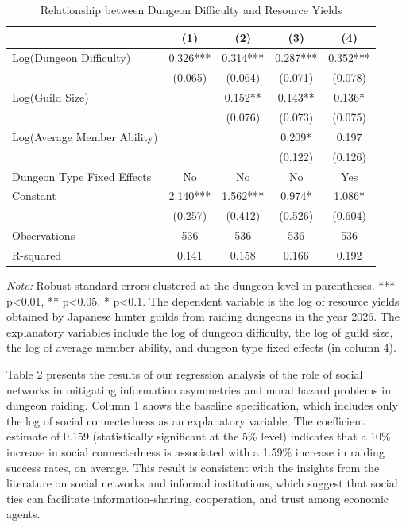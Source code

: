 \documentclass[12pt, a4paper]{article}
\begin{document}
\begin{table}[ht]
\centering
\caption{Relationship between Dungeon Difficulty and Resource Yields}
\label{tab:dungeon_difficulty_resource_yield}
\begin{tabular}{lcccc}
\hline
 & (1) & (2) & (3) & (4) \\
\hline
Log(Dungeon Difficulty) & 0.326*** & 0.314*** & 0.287*** & 0.352*** \\
 & (0.065) & (0.064) & (0.071) & (0.078) \\
Log(Guild Size) &  & 0.152** & 0.143** & 0.136* \\
 &  & (0.076) & (0.073) & (0.075) \\
Log(Average Member Ability) &  &  & 0.209* & 0.197 \\
 &  &  & (0.122) & (0.126) \\
Dungeon Type Fixed Effects & No & No & No & Yes \\
Constant & 2.140*** & 1.562*** & 0.974* & 1.086* \\
 & (0.257) & (0.412) & (0.526) & (0.604) \\
\hline
Observations & 536 & 536 & 536 & 536 \\
R-squared & 0.141 & 0.158 & 0.166 & 0.192 \\
\hline
\end{tabular}

\medskip
\small
\textit{Note:} Robust standard errors clustered at the dungeon level in parentheses. *** p<0.01, ** p<0.05, * p<0.1. The dependent variable is the log of resource yields obtained by Japanese hunter guilds from raiding dungeons in the year 2026. The explanatory variables include the log of dungeon difficulty, the log of guild size, the log of average member ability, and dungeon type fixed effects (in column 4).
\end{table}

Table 2 presents the results of our regression analysis of the role of social networks in mitigating information asymmetries and moral hazard problems in dungeon raiding. Column 1 shows the baseline specification, which includes only the log of social connectedness as an explanatory variable. The coefficient estimate of 0.159 (statistically significant at the 5\% level) indicates that a 10\% increase in social connectedness is associated with a 1.59\% increase in raiding success rates, on average. This result is consistent with the insights from the literature on social networks and informal institutions, which suggest that social ties can facilitate information-sharing, cooperation, and trust among economic agents.
\end{document}
